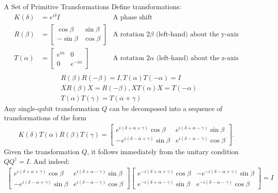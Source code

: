 \documentclass{beamer}
\begin{document}
\begin{frame}{A Set of Primitive Transformations}
  {\tiny
    Define transformations:
    \begin{align*}
      K(\delta) &= e^{i\delta}I & \mbox{A phase shift} \\
      R(\beta)  &= \begin{bmatrix} \cos\beta & \sin\beta \\ -\sin\beta & \cos\beta \end{bmatrix}  & \mbox{A rotation $2\beta$ (left-hand) about the y-axis} \\
      T(\alpha) &= \begin{bmatrix} e^{i\alpha} & 0 \\ 0 & e^{-i\alpha} \end{bmatrix} & \mbox{A rotation $2\alpha$ (left-hand) about the z-axis} \\
    \end{align*}
    \begin{align*}
      &R(\beta)R(-\beta) = I, T(\alpha)T(-\alpha) = I \\
      &XR(\beta)X = R(-\beta), XT(\alpha)X = T(-\alpha) \\
      &T(\alpha)T(\gamma) = T(\alpha + \gamma)
    \end{align*}
    Any single-qubit transformation $Q$ can be decomposed into a sequence of transformations of the form
    \begin{align*}
      K(\delta)T(\alpha)R(\beta)T(\gamma) =
       \begin{bmatrix}
          e^{i(\delta + \alpha + \gamma)} \cos\beta & e^{i(\delta + \alpha - \gamma)} \sin\beta \\
         -e^{i(\delta - \alpha + \gamma)} \sin\beta & e^{i(\delta - \alpha - \gamma)} \cos\beta
       \end{bmatrix}.
    \end{align*}
    Given the transformation $Q$, it follows immediately from the unitary condition $QQ^{\dagger}=I$.
    And indeed:
    \begin{align*}
      \begin{bmatrix}
         e^{i(\delta + \alpha + \gamma)} \cos\beta & e^{i(\delta + \alpha - \gamma)} \sin\beta \\
        -e^{i(\delta - \alpha + \gamma)} \sin\beta & e^{i(\delta - \alpha - \gamma)} \cos\beta
      \end{bmatrix}
      \begin{bmatrix}
        e^{-i(\delta + \alpha + \gamma)} \cos\beta & -e^{-i(\delta - \alpha + \gamma)} \sin\beta \\
        e^{-i(\delta + \alpha - \gamma)} \sin\beta &  e^{-i(\delta - \alpha - \gamma)} \cos\beta
      \end{bmatrix} = I
    \end{align*}
  }%
\end{frame}
\end{document}
